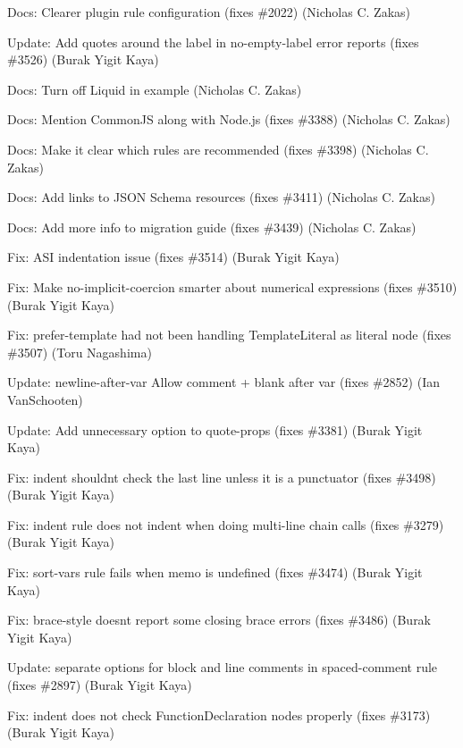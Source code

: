 \begin{DoxyItemize}
\item Docs\+: Clearer plugin rule configuration (fixes \#2022) (Nicholas C. Zakas)
\item Update\+: Add quotes around the label in {\ttfamily no-\/empty-\/label} error reports (fixes \#3526) (Burak Yigit Kaya)
\item Docs\+: Turn off Liquid in example (Nicholas C. Zakas)
\item Docs\+: Mention Common\+JS along with Node.\+js (fixes \#3388) (Nicholas C. Zakas)
\item Docs\+: Make it clear which rules are recommended (fixes \#3398) (Nicholas C. Zakas)
\item Docs\+: Add links to J\+S\+ON Schema resources (fixes \#3411) (Nicholas C. Zakas)
\item Docs\+: Add more info to migration guide (fixes \#3439) (Nicholas C. Zakas)
\item Fix\+: A\+SI indentation issue (fixes \#3514) (Burak Yigit Kaya)
\item Fix\+: Make {\ttfamily no-\/implicit-\/coercion} smarter about numerical expressions (fixes \#3510) (Burak Yigit Kaya)
\item Fix\+: {\ttfamily prefer-\/template} had not been handling Template\+Literal as literal node (fixes \#3507) (Toru Nagashima)
\item Update\+: {\ttfamily newline-\/after-\/var} Allow comment + blank after var (fixes \#2852) (Ian Van\+Schooten)
\item Update\+: Add {\ttfamily unnecessary} option to {\ttfamily quote-\/props} (fixes \#3381) (Burak Yigit Kaya)
\item Fix\+: {\ttfamily indent} shouldn\textquotesingle{}t check the last line unless it is a punctuator (fixes \#3498) (Burak Yigit Kaya)
\item Fix\+: {\ttfamily indent} rule does not indent when doing multi-\/line chain calls (fixes \#3279) (Burak Yigit Kaya)
\item Fix\+: sort-\/vars rule fails when memo is undefined (fixes \#3474) (Burak Yigit Kaya)
\item Fix\+: {\ttfamily brace-\/style} doesn\textquotesingle{}t report some closing brace errors (fixes \#3486) (Burak Yigit Kaya)
\item Update\+: separate options for block and line comments in {\ttfamily spaced-\/comment} rule (fixes \#2897) (Burak Yigit Kaya)
\item Fix\+: {\ttfamily indent} does not check Function\+Declaration nodes properly (fixes \#3173) (Burak Yigit Kaya)

\end{DoxyItemize}
